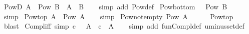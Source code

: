 \begin{isabellebody}
\endisatagproof
{\isafoldproof}%
%
\isadelimproof
\isanewline
%
\endisadelimproof
\isanewline
{}\isamarkupfalse%
\ PowD{\isacharcolon}{\kern0pt}\ {\isachardoublequoteopen}A\ {\isasymin}\ Pow\ B\ {\isasymLongrightarrow}\ A\ {\isasymsubseteq}\ B{\isachardoublequoteclose}\isanewline
%
\isadelimproof
\ \ %
\endisadelimproof
%
\isatagproof
{}\isamarkupfalse%
\ {\isacharparenleft}{\kern0pt}simp\ add{\isacharcolon}{\kern0pt}\ Pow{\isacharunderscore}{\kern0pt}def{\isacharparenright}{\kern0pt}%
\endisatagproof
{\isafoldproof}%
%
\isadelimproof
\isanewline
%
\endisadelimproof
\isanewline
{}\isamarkupfalse%
\ Pow{\isacharunderscore}{\kern0pt}bottom{\isacharcolon}{\kern0pt}\ {\isachardoublequoteopen}{\isacharbraceleft}{\kern0pt}{\isacharbraceright}{\kern0pt}\ {\isasymin}\ Pow\ B{\isachardoublequoteclose}\isanewline
%
\isadelimproof
\ \ %
\endisadelimproof
%
\isatagproof
{}\isamarkupfalse%
\ simp%
\endisatagproof
{\isafoldproof}%
%
\isadelimproof
\isanewline
%
\endisadelimproof
\isanewline
{}\isamarkupfalse%
\ Pow{\isacharunderscore}{\kern0pt}top{\isacharcolon}{\kern0pt}\ {\isachardoublequoteopen}A\ {\isasymin}\ Pow\ A{\isachardoublequoteclose}\isanewline
%
\isadelimproof
\ \ %
\endisadelimproof
%
\isatagproof
{}\isamarkupfalse%
\ simp%
\endisatagproof
{\isafoldproof}%
%
\isadelimproof
\isanewline
%
\endisadelimproof
\isanewline
{}\isamarkupfalse%
\ Pow{\isacharunderscore}{\kern0pt}not{\isacharunderscore}{\kern0pt}empty{\isacharcolon}{\kern0pt}\ {\isachardoublequoteopen}Pow\ A\ {\isasymnoteq}\ {\isacharbraceleft}{\kern0pt}{\isacharbraceright}{\kern0pt}{\isachardoublequoteclose}\isanewline
%
\isadelimproof
\ \ %
\endisadelimproof
%
\isatagproof
{}\isamarkupfalse%
\ Pow{\isacharunderscore}{\kern0pt}top\ \isamarkupfalse%
\ blast%
\endisatagproof
{\isafoldproof}%
%
\isadelimproof
%
\endisadelimproof
%
\isadelimdocument
%
\endisadelimdocument
%
\isatagdocument
%
\isamarkuptrue%
%
\endisatagdocument
{\isafolddocument}%
%
\isadelimdocument
%
\endisadelimdocument
{}\isamarkupfalse%
\ Compl{\isacharunderscore}{\kern0pt}iff\ {\isacharbrackleft}{\kern0pt}simp{\isacharbrackright}{\kern0pt}{\isacharcolon}{\kern0pt}\ {\isachardoublequoteopen}c\ {\isasymin}\ {\isacharminus}{\kern0pt}\ A\ {\isasymlongleftrightarrow}\ c\ {\isasymnotin}\ A{\isachardoublequoteclose}\isanewline
%
\isadelimproof
\ \ %
\endisadelimproof
%
\isatagproof
{}\isamarkupfalse%
\ {\isacharparenleft}{\kern0pt}simp\ add{\isacharcolon}{\kern0pt}\ fun{\isacharunderscore}{\kern0pt}Compl{\isacharunderscore}{\kern0pt}def\ uminus{\isacharunderscore}{\kern0pt}set{\isacharunderscore}{\kern0pt}def{\isacharparenright}{\kern0pt}%

\end{isabellebody}

